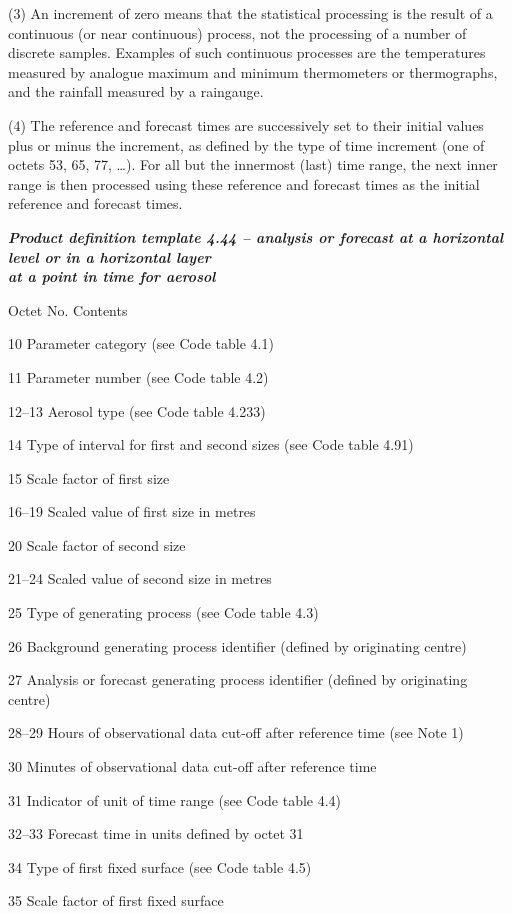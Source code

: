 (3) An increment of zero means that the statistical processing is the result of a continuous (or near continuous) process, not the processing of a number of discrete samples. Examples of such continuous processes are the temperatures measured by analogue maximum and minimum thermometers or thermographs, and the rainfall measured by a raingauge.

(4) The reference and forecast times are successively set to their initial values plus or minus the increment, as defined by the type of time increment (one of octets 53, 65, 77, \ldots). For all but the innermost (last) time range, the next inner range is then processed using these reference and forecast times as the initial reference and forecast times.

\emph{\textbf{Product definition template 4.44 -- analysis or forecast at a horizontal level or in a horizontal layer\\
at a point in time for aerosol}}

Octet No. Contents

10 Parameter category (see Code table 4.1)

11 Parameter number (see Code table 4.2)

12--13 Aerosol type (see Code table 4.233)

14 Type of interval for first and second sizes (see Code table 4.91)

15 Scale factor of first size

16--19 Scaled value of first size in metres

20 Scale factor of second size

21--24 Scaled value of second size in metres

25 Type of generating process (see Code table 4.3)

26 Background generating process identifier (defined by originating centre)

27 Analysis or forecast generating process identifier (defined by originating centre)

28--29 Hours of observational data cut-off after reference time (see Note 1)

30 Minutes of observational data cut-off after reference time

31 Indicator of unit of time range (see Code table 4.4)

32--33 Forecast time in units defined by octet 31

34 Type of first fixed surface (see Code table 4.5)

35 Scale factor of first fixed surface

